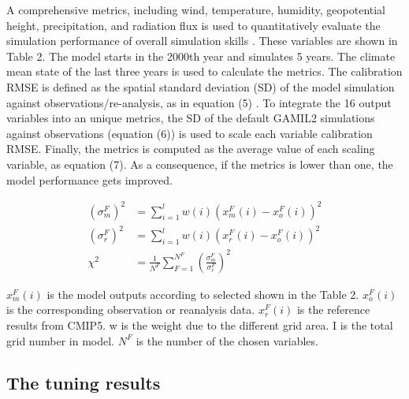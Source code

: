 \documentclass[gmd, manuscript]{copernicus}
\begin{document}
A comprehensive metrics, including wind, temperature, humidity, geopotential height, precipitation, and radiation flux is used to quantitatively evaluate the simulation performance of overall simulation skills \citep{murphy2004quantification, gleckler2008performance, reichler2008well}. These variables are shown in Table 2. The model starts in the 2000th year and simulates 5 years. The climate mean state of the last three years is used to calculate the metrics. The calibration RMSE is defined as the spatial standard deviation (SD) of the model simulation against observations/re-analysis, as in equation (5) \citep{taylor2001summarizing,yang2013uncertainty}. To integrate the 16 output variables into an unique metrics, the SD of the default GAMIL2  simulations against observations (equation (6)) is used to scale each variable calibration RMSE. Finally, the  metrics is computed as the average value of each scaling variable, as equation (7). As a consequence, if the metrics is lower than one, the model performance gets improved.


\begin{align}
(\sigma_m^F)^2 &= \sum_{i=1}^l w(i)(x_m^F(i) - x_o^F(i))^2 \\
(\sigma_r^F)^2 &= \sum_{i=1}^l w(i)(x_r^F(i) - x_o^F(i))^2 \\
\chi^2 &= \frac{1}{N^F}\sum_{F=1}^{N^F} (\frac{\sigma_m^F}{\sigma_r^F})^2
\end{align}

$x_m^F(i)$ is the model outputs according to selected shown in the Table 2. $x_o^F(i)$ is the 
corresponding observation or reanalysis data. $x_r^F(i)$ is the reference results from CMIP5. w is 
the weight due to the different grid area. I is the total grid number in model. $N^F$ is the 
number of the chosen variables.


\subsection{The tuning results}
\end{document}
